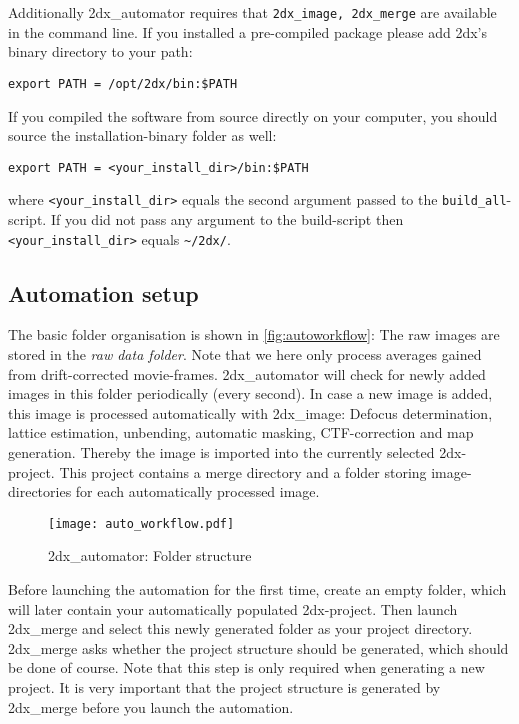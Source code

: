 Additionally 2dx\_automator requires that \texttt{2dx\_image, 2dx\_merge} are available in the command line. If you installed a pre-compiled package please add 2dx's binary directory to your path:

\texttt{export PATH = /opt/2dx/bin:\$PATH}

If you compiled the software from source directly on your computer, you should source the installation-binary folder as well:

\texttt{export PATH = <your\_install\_dir>/bin:\$PATH}

where \texttt{<your\_install\_dir>} equals the second argument passed to the \texttt{build\_all}-script. If you did not pass any argument to the build-script then \texttt{<your\_install\_dir>} equals \texttt{\textasciitilde{}/2dx/}.

\subsection{Automation setup}

The basic folder organisation is shown in \autoref{fig:autoworkflow}: The raw images are stored in the \textit{raw data folder}. Note that we here only process averages gained from drift-corrected movie-frames. 2dx\_automator will check for newly added images in this folder periodically (every second). In case a new image is added, this image is processed automatically with 2dx\_image: Defocus determination, lattice estimation, unbending, automatic masking, CTF-correction and map generation. Thereby the image is imported into the currently selected 2dx-project. This project contains a merge directory and a folder storing image-directories for each automatically processed image.

\begin{figure}
	\centering
	\texttt{[image: auto\_workflow.pdf]}
	\caption{2dx\_automator: Folder structure}
	\label{fig:autoworkflow}
\end{figure}

Before launching the automation for the first time, create an empty folder, which will later contain your automatically populated 2dx-project. Then launch 2dx\_merge and select this newly generated folder as your project directory. 2dx\_merge asks whether the project structure should be generated, which should be done of course. Note that this step is only required when generating a new project. It is very important that the project structure is generated by 2dx\_merge before you launch the automation.


